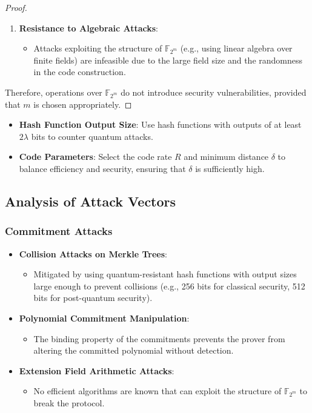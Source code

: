 \documentclass{article}
\theoremstyle{plain}
\theoremstyle{definition}
\theoremstyle{remark}
\theoremstyle{problem}
\begin{document}
\begin{proof}
\begin{enumerate}
    \item \textbf{Resistance to Algebraic Attacks}:
    \begin{itemize}
        \item Attacks exploiting the structure of \(\mathbb{F}_{2^m}\) (e.g., using linear algebra over finite fields) are infeasible due to the large field size and the randomness in the code construction.
    \end{itemize}
\end{enumerate}

Therefore, operations over \(\mathbb{F}_{2^m}\) do not introduce security vulnerabilities, provided that \(m\) is chosen appropriately.
\end{proof}

\begin{itemize}
    \item \textbf{Hash Function Output Size}: Use hash functions with outputs of at least \(2\lambda\) bits to counter quantum attacks.
    \item \textbf{Code Parameters}: Select the code rate \(R\) and minimum distance \(\delta\) to balance efficiency and security, ensuring that \(\delta\) is sufficiently high.
\end{itemize}

\subsection{Analysis of Attack Vectors}

\subsubsection{Commitment Attacks}
\begin{itemize}
    \item \textbf{Collision Attacks on Merkle Trees}:
    \begin{itemize}
        \item Mitigated by using quantum-resistant hash functions with output sizes large enough to prevent collisions (e.g., 256 bits for classical security, 512 bits for post-quantum security).
    \end{itemize}

    \item \textbf{Polynomial Commitment Manipulation}:
    \begin{itemize}
        \item The binding property of the commitments prevents the prover from altering the committed polynomial without detection.
    \end{itemize}

    \item \textbf{Extension Field Arithmetic Attacks}:
    \begin{itemize}
        \item No efficient algorithms are known that can exploit the structure of \(\mathbb{F}_{2^m}\) to break the protocol.
    \end{itemize}
\end{itemize}
\end{document}
